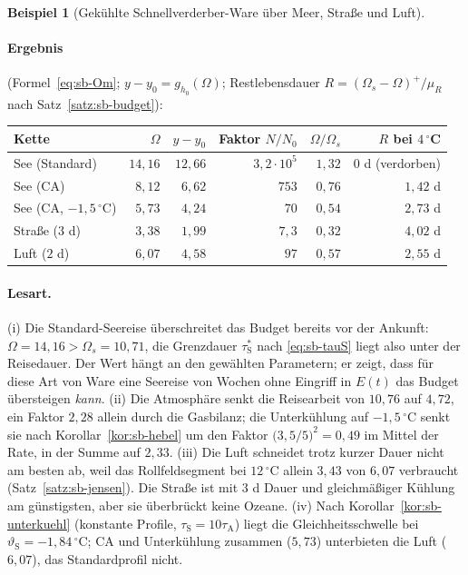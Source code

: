 \documentclass[a4paper, 12pt, twoside, openright]{report}
\theoremstyle{definition}
\theoremstyle{definition}
\newtheorem{beispiel}{Beispiel}[chapter]
\begin{document}
\begin{beispiel}[Gekühlte Schnellverderber-Ware über Meer, Straße und Luft]
\paragraph{Ergebnis} (Formel~\eqref{eq:sb-Om}; $y-y_0=g_{h_0}(\Omega)$; Restlebensdauer
$R=(\Omega_s-\Omega)^+/\mu_R$ nach Satz~\ref{satz:sb-budget}):
\begin{center}
\begin{tabular}{lrrrrr}
\toprule
Kette & $\Omega$ & $y-y_0$ & Faktor $N/N_0$ & $\Omega/\Omega_s$ & $R$ bei $4\,{}^\circ$C\\
\midrule
See (Standard)            & $14{,}16$ & $12{,}66$ & $3{,}2\cdot10^{5}$ & $1{,}32$ & $0$ d (verdorben)\\
See (CA)                  & $8{,}12$  & $6{,}62$  & $753$              & $0{,}76$ & $1{,}42$ d\\
See (CA, $-1{,}5\,{}^\circ$C) & $5{,}73$ & $4{,}24$ & $70$              & $0{,}54$ & $2{,}73$ d\\
Straße ($3$ d)            & $3{,}38$  & $1{,}99$  & $7{,}3$            & $0{,}32$ & $4{,}02$ d\\
Luft ($2$ d)              & $6{,}07$  & $4{,}58$  & $97$               & $0{,}57$ & $2{,}55$ d\\
\bottomrule
\end{tabular}
\end{center}

\paragraph{Lesart.}
(i) Die Standard-Seereise überschreitet das Budget bereits vor der Ankunft: $\Omega=14{,}16>\Omega_s=10{,}71$,
die Grenzdauer $\tau_{\mathrm S}^\ast$ nach \eqref{eq:sb-tauS} liegt also unter der Reisedauer. Der Wert hängt
an den gewählten Parametern; er zeigt, dass für diese Art von Ware eine Seereise von Wochen ohne
Eingriff in $E(t)$ das Budget übersteigen \emph{kann}.
(ii) Die Atmosphäre senkt die Reisearbeit von $10{,}76$ auf $4{,}72$, ein Faktor $2{,}28$ allein durch
die Gasbilanz; die Unterkühlung auf $-1{,}5\,{}^\circ$C senkt sie nach Korollar~\ref{kor:sb-hebel}
um den Faktor $\bigl(3{,}5/5\bigr)^2=0{,}49$ im Mittel der Rate, in der Summe auf $2{,}33$.
(iii) Die Luft schneidet trotz kurzer Dauer nicht am besten ab, weil das Rollfeldsegment bei
$12\,{}^\circ$C allein $3{,}43$ von $6{,}07$ verbraucht (Satz~\ref{satz:sb-jensen}). Die Straße ist mit
$3$ d Dauer und gleichmäßiger Kühlung am günstigsten, aber sie überbrückt keine Ozeane.
(iv) Nach Korollar~\ref{kor:sb-unterkuehl} (konstante Profile, $\tau_{\mathrm S}=10\tau_{\mathrm A}$) liegt die
Gleichheitsschwelle bei $\vartheta_{\mathrm S}=-1{,}84\,{}^\circ$C; CA und Unterkühlung zusammen
($5{,}73$) unterbieten die Luft ($6{,}07$), das Standardprofil nicht.
\end{beispiel}
\end{document}
